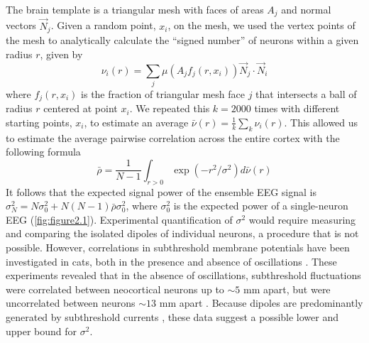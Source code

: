 The brain template is a triangular mesh with faces of areas $A_j$ and normal vectors ${\vec{N}}_j$. Given a random point, $x_i$, on the mesh, we used the vertex points of the mesh to analytically calculate the “signed number” of neurons within a given radius $r$, given by 
\begin{equation}
\nu_i\left(r\right)=\sum_{j}{\mu\left(A_jf_j\left(r,x_i\right)\right){\vec{N}}_j\cdot{\vec{N}}_i}
\end{equation}
where $f_j\left(r,x_i\right)$ is the fraction of triangular mesh face $j$ that intersects a ball of radius $r$ centered at point $x_i$. We repeated this $k=2000$ times with different starting points, $x_i$, to estimate an average $\bar{\nu}\left(r\right)=\frac{1}{k}\sum_{k}{\nu_i(r)}$. This allowed us to estimate the average pairwise correlation across the entire cortex with the following formula 
\begin{equation}
\bar{\rho}=\frac{1}{N-1}\int_{r>0}{\exp{\left(-r^2/\sigma^2\right)}d\bar{\nu}\left(r\right)}
\end{equation}
It follows that the expected signal power of the ensemble EEG signal is $\sigma_N^2=N\sigma_0^2+N\left(N-1\right)\bar{\rho}\sigma_0^2$, where $\sigma_0^2$ is the expected power of a single-neuron EEG (\autoref{fig:figure2.1}).
Experimental quantification of $\sigma^2$ would require measuring and comparing the isolated dipoles of individual neurons, a procedure that is not possible. However, correlations in subthreshold membrane potentials have been investigated in cats, both in the presence and absence of oscillations \cite{Volgushev2011}. These experiments revealed that in the absence of oscillations, subthreshold fluctuations were correlated between neocortical neurons up to ${\sim}5$ mm apart, but were uncorrelated between neurons ${\sim}13$ \unit{\milli\meter} apart \cite{Volgushev2011}. Because dipoles are predominantly generated by subthreshold currents \cite{Buzsaki2012, Einevoll2013}, these data suggest a possible lower and upper bound for $\sigma^2$.

